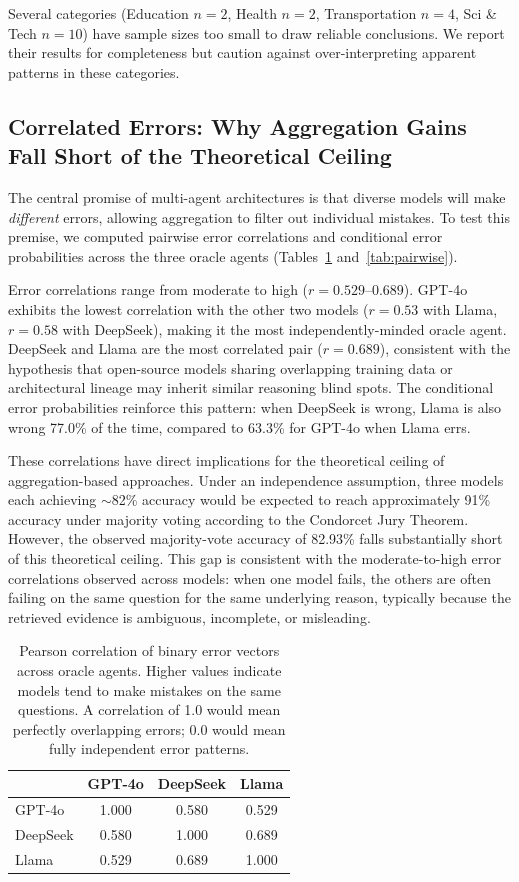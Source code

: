 Several categories (Education $n=2$, Health $n=2$, Transportation $n=4$, Sci \& Tech $n=10$) have sample sizes too small to draw reliable conclusions. We report their results for completeness but caution against over-interpreting apparent patterns in these categories.

\subsection{Correlated Errors: Why Aggregation Gains Fall Short of the Theoretical Ceiling}
\label{sec:errcorr}

The central promise of multi-agent architectures is that diverse models will make \emph{different} errors, allowing aggregation to filter out individual mistakes. To test this premise, we computed pairwise error correlations and conditional error probabilities across the three oracle agents (Tables~\ref{tab:errcorr} and~\ref{tab:pairwise}).



Error correlations range from moderate to high ($r = 0.529$--$0.689$). GPT-4o exhibits the lowest correlation with the other two models ($r = 0.53$ with Llama, $r = 0.58$ with DeepSeek), making it the most independently-minded oracle agent. DeepSeek and Llama are the most correlated pair ($r = 0.689$), consistent with the hypothesis that open-source models sharing overlapping training data or architectural lineage may inherit similar reasoning blind spots. The conditional error probabilities reinforce this pattern: when DeepSeek is wrong, Llama is also wrong 77.0\% of the time, compared to 63.3\% for GPT-4o when Llama errs.

These correlations have direct implications for the theoretical ceiling of aggregation-based approaches. Under an independence assumption, three models each achieving $\sim$82\% accuracy would be expected to reach approximately 91\% accuracy under majority voting according to the Condorcet Jury Theorem. However, the observed majority-vote accuracy of 82.93\% falls substantially short of this theoretical ceiling. This gap is consistent with the moderate-to-high error correlations observed across models: when one model fails, the others are often failing on the same question for the same underlying reason, typically because the retrieved evidence is ambiguous, incomplete, or misleading.


\begin{table}[t]
\centering
\caption{Pearson correlation of binary error vectors across oracle agents. Higher values indicate models tend to make mistakes on the same questions. A correlation of 1.0 would mean perfectly overlapping errors; 0.0 would mean fully independent error patterns.}
\label{tab:errcorr}
\begin{tabular}{lccc}
\toprule
 & \textbf{GPT-4o} & \textbf{DeepSeek} & \textbf{Llama} \\
\midrule
GPT-4o   & 1.000 & 0.580 & 0.529 \\
DeepSeek & 0.580 & 1.000 & 0.689 \\
Llama    & 0.529 & 0.689 & 1.000 \\
\bottomrule
\end{tabular}
\end{table}


